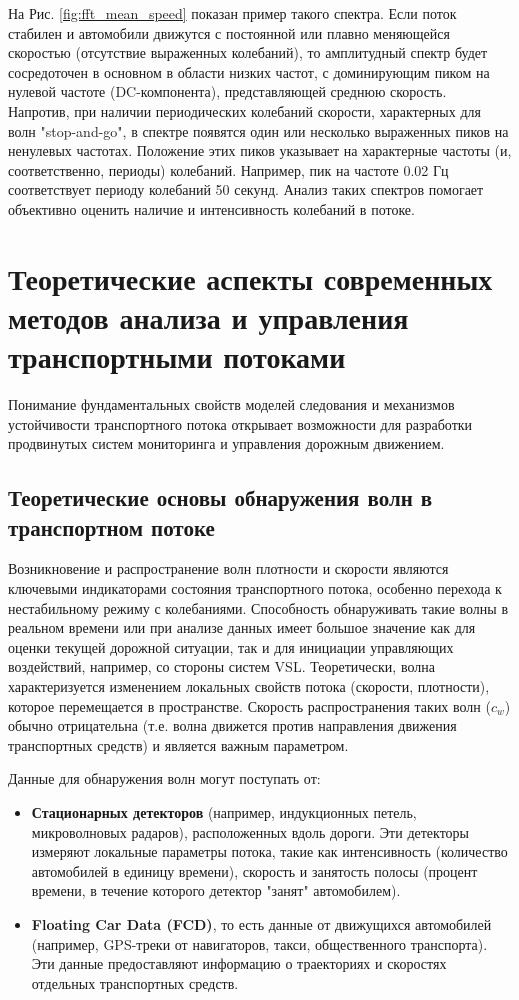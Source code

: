 \documentclass[12pt, a4paper]{article}
\begin{document}
На Рис. \ref{fig:fft_mean_speed} показан пример такого спектра. 
Если поток стабилен и автомобили движутся с постоянной или плавно меняющейся скоростью (отсутствие выраженных колебаний), то амплитудный спектр будет сосредоточен в основном в области низких частот, с доминирующим пиком на нулевой частоте (DC-компонента), представляющей среднюю скорость. 
Напротив, при наличии периодических колебаний скорости, характерных для волн "stop-and-go", в спектре появятся один или несколько выраженных пиков на ненулевых частотах. Положение этих пиков указывает на характерные частоты (и, соответственно, периоды) колебаний. Например, пик на частоте 0.02 Гц соответствует периоду колебаний 50 секунд. Анализ таких спектров помогает объективно оценить наличие и интенсивность колебаний в потоке.

\section{Теоретические аспекты современных методов анализа и управления транспортными потоками}
\label{sec:advanced_concepts_theory}

Понимание фундаментальных свойств моделей следования и механизмов устойчивости транспортного потока открывает возможности для разработки продвинутых систем мониторинга и управления дорожным движением.

\subsection{Теоретические основы обнаружения волн в транспортном потоке}
\label{subsec:wave_detection_theory}

Возникновение и распространение волн плотности и скорости являются ключевыми индикаторами состояния транспортного потока, особенно перехода к нестабильному режиму с колебаниями. Способность обнаруживать такие волны в реальном времени или при анализе данных имеет большое значение как для оценки текущей дорожной ситуации, так и для инициации управляющих воздействий, например, со стороны систем VSL.
Теоретически, волна характеризуется изменением локальных свойств потока (скорости, плотности), которое перемещается в пространстве. Скорость распространения таких волн ($c_w$) обычно отрицательна (т.е. волна движется против направления движения транспортных средств) и является важным параметром.

Данные для обнаружения волн могут поступать от:
\begin{itemize}
    \item \textbf{Стационарных детекторов} (например, индукционных петель, микроволновых радаров), расположенных вдоль дороги. Эти детекторы измеряют локальные параметры потока, такие как интенсивность (количество автомобилей в единицу времени), скорость и занятость полосы (процент времени, в течение которого детектор "занят" автомобилем).
    \item \textbf{Floating Car Data (FCD)}, то есть данные от движущихся автомобилей (например, GPS-треки от навигаторов, такси, общественного транспорта). Эти данные предоставляют информацию о траекториях и скоростях отдельных транспортных средств.
\end{itemize}
\end{document}
